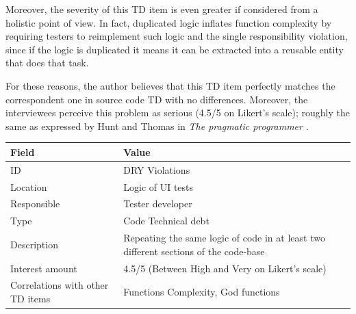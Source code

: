         \label{sec:disc-rq3-dry}
        Moreover, the severity of this TD item is even greater if considered from a holistic point of view. In fact, duplicated logic inflates function complexity by requiring testers to reimplement such logic and the single responsibility violation, since if the logic is duplicated it means it can be extracted into a reusable entity that does that task.

        For these reasons, the author believes that this TD item perfectly matches the correspondent one in source code TD with no differences. Moreover, the interviewees perceive this problem as serious (4.5/5 on Likert's scale); roughly the same as expressed by Hunt and Thomas in \textit{The pragmatic programmer} \cite{thomas1999pragmatic}.


  \begin{table}[!htbp]
		\centering
		\tabulinesep=1.2mm
		\begin{tabu} to \textwidth {|X|X[3]|}

			\hline
			\textbf{Field} & \textbf{Value} \\
			\hline

			ID & DRY Violations \\
			\hline

			Location & Logic of UI tests \\
			\hline

			Responsible & Tester developer \\
			\hline

			Type & Code Technical debt \\
			\hline

			Description & Repeating the same logic of code in at least two different sections of the code-base\\
			\hline



			Interest amount &  4.5/5 (Between High and Very on Likert's scale) \\
			\hline



			Correlations with other TD items & Functions Complexity, God functions\\
			\hline


\end{tabu}
\end{table}
